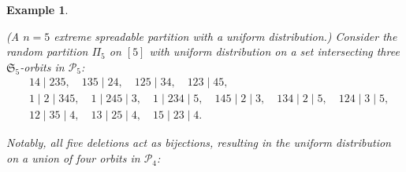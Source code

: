 \documentclass{article}
\newtheorem{example}{Example}
\begin{document}
\begin{example}\label{Ex2}{\rm (A $n=5$ extreme spreadable partition with a uniform distribution.)
Consider the random partition $\Pi_5$ on $[5]$ with uniform distribution on a set intersecting  three  ${\mathfrak S}_5$-orbits in $\mathcal P_5$:
\begin{equation*}
\begin{aligned}
&14 \mid 235, \quad 135 \mid 24, \quad 125 \mid 34, \quad 123 \mid 45, \\
&1 \mid 2 \mid 345, \quad 1 \mid 245 \mid 3, \quad 1 \mid 234 \mid 5, \quad 145 \mid 2 \mid 3, \quad 134 \mid 2 \mid 5, \quad 124 \mid 3 \mid 5, \\
&12 \mid 35 \mid 4, \quad 13 \mid 25 \mid 4, \quad 15 \mid 23 \mid 4.
\end{aligned}
\end{equation*}


Notably, all five deletions act as bijections, resulting in the uniform distribution on a union of four orbits in $\mathcal P_4$:

}
\end{example}
\end{document}

